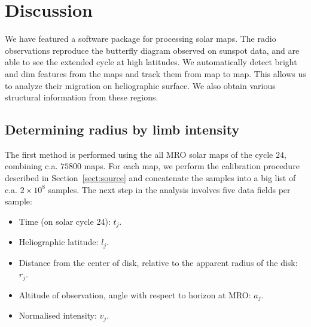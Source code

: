 \documentclass{aa}
\begin{document}
\section{Discussion}\label{sect:discussion}

We have featured a software package for processing solar maps. The radio observations reproduce the butterfly diagram 
observed on sunspot data, and are able to see the extended cycle at high latitudes. We automatically detect bright and 
dim features from the maps and track them from map to map. This allows us to analyze their migration on heliographic 
surface. We also obtain various structural information from these regions.

  \subsection{Determining radius by limb intensity} \label{sect:radius_method1}

  The first method is performed using the all MRO solar maps of the cycle $24$, combining c.a. $75800$ maps. For each 
  map, we perform the calibration procedure described in Section~\ref{sect:source} and concatenate the samples into a 
  big list of c.a. $2 \times 10^8$ samples. The next step in the analysis involves five data fields per sample:
  \begin{itemize}
  \item Time (on solar cycle 24): $t_j$.
  \item Heliographic latitude: $l_j$.
  \item Distance from the center of disk, relative to the apparent radius of the disk: $r_j$.
  \item Altitude of observation, angle with respect to horizon at MRO: $a_j$.
  \item Normalised intensity: $v_j$.
  \end{itemize}
\end{document}
